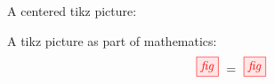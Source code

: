 \documentclass{article}
\begin{document}
A centered tikz picture:

A tikz picture as part of mathematics:
\[
\tikzfig{fig} \ =\ 
\tikzfig{fig}
\]
\end{document}
